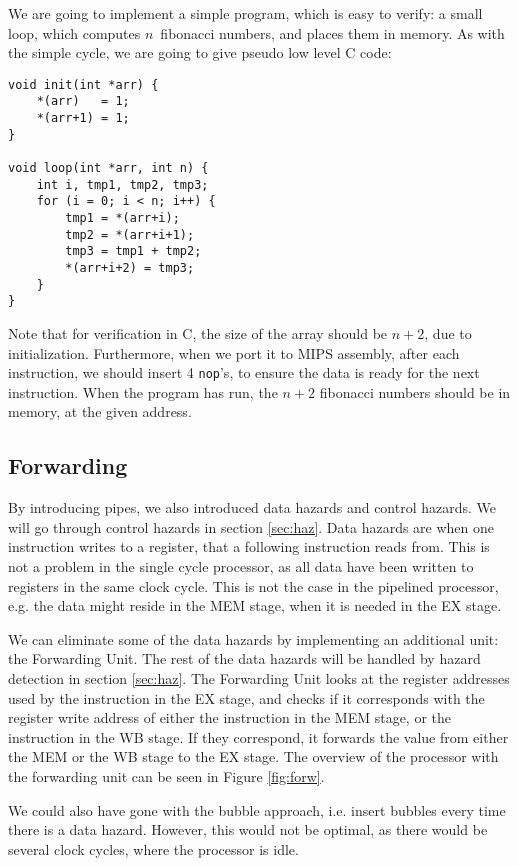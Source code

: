 We are going to implement a simple program, which is easy to verify: a small
loop, which computes $n$ fibonacci numbers, and places them in memory. As with
the simple cycle, we are going to give pseudo low level C code:
\begin{lstlisting}
void init(int *arr) {
    *(arr)   = 1;
    *(arr+1) = 1;
}

void loop(int *arr, int n) {
    int i, tmp1, tmp2, tmp3;
    for (i = 0; i < n; i++) {
        tmp1 = *(arr+i);
        tmp2 = *(arr+i+1);
        tmp3 = tmp1 + tmp2;
        *(arr+i+2) = tmp3;
    }
}
\end{lstlisting}
Note that for verification in C, the size of the array should be $n+2$, due to
initialization. Furthermore, when we port it to MIPS assembly, after each
instruction, we should insert 4 \texttt{nop}'s, to ensure the data is ready for
the next instruction. When the program has run, the $n+2$ fibonacci numbers
should be in memory, at the given address.

\subsection{Forwarding}\label{sec:forw}
By introducing pipes, we also introduced data hazards and control hazards. We
will go through control hazards in section \ref{sec:haz}. Data hazards are when
one instruction writes to a register, that a following instruction reads from.
This is not a problem in the single cycle processor, as all data have been
written to registers in the same clock cycle. This is not the case in the
pipelined processor, e.g. the data might reside in the MEM stage, when it is
needed in the EX stage.

We can eliminate some of the data hazards by implementing an additional unit:
the Forwarding Unit. The rest of the data hazards will be handled by hazard
detection in section \ref{sec:haz}. The Forwarding Unit looks at the register
addresses used by the instruction in the EX stage, and checks if it corresponds
with the register write address of either the instruction in the MEM stage, or
the instruction in the WB stage. If they correspond, it forwards the value from
either the MEM or the WB stage to the EX stage. The overview of the processor
with the forwarding unit can be seen in Figure \ref{fig:forw}.

We could also have gone with the bubble approach, i.e. insert bubbles every
time there is a data hazard. However, this would not be optimal, as there would
be several clock cycles, where the processor is idle.

